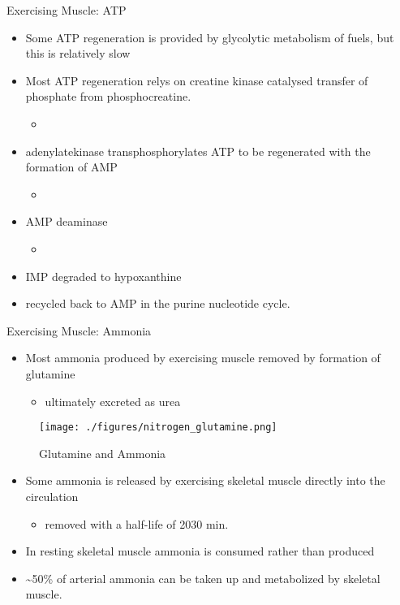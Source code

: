 \documentclass[presentation, smaller]{beamer}
\begin{document}
\begin{frame}[label={sec:org8be6a09}]{Exercising Muscle: ATP}
\begin{itemize}
\item Some ATP regeneration is provided by glycolytic metabolism of fuels,
but this is relatively slow
\item Most ATP regeneration relys on creatine kinase catalysed transfer of
phosphate from phosphocreatine.

\begin{itemize}
\item {}
\end{itemize}

\item adenylatekinase transphosphorylates ATP to be regenerated with the formation
of AMP

\begin{itemize}
\item {}
\end{itemize}

\item AMP deaminase
\begin{itemize}
\item {}
\end{itemize}

\item IMP degraded to hypoxanthine
\item recycled back to AMP in the purine nucleotide cycle.
\end{itemize}
\end{frame}

\begin{frame}[label={sec:org0eb6d23}]{Exercising Muscle: Ammonia}
\begin{itemize}
\item Most ammonia produced by exercising muscle removed by formation of glutamine
\begin{itemize}
\item ultimately excreted as urea
\end{itemize}
\end{itemize}

\begin{figure}[htbp]
\centering
\texttt{[image: ./figures/nitrogen\_glutamine.png]}
\caption[gln]{\label{fig:org70c30d3}
Glutamine and Ammonia}
\end{figure}

\begin{itemize}
\item Some ammonia is released by exercising skeletal muscle directly into the circulation
\begin{itemize}
\item removed with a half-life of 20\textpm{}30 min.
\end{itemize}
\item In resting skeletal muscle ammonia is consumed rather than produced
\item \textasciitilde{}50\% of arterial ammonia can be taken up and metabolized by skeletal muscle.
\end{itemize}
\end{frame}
\end{document}
